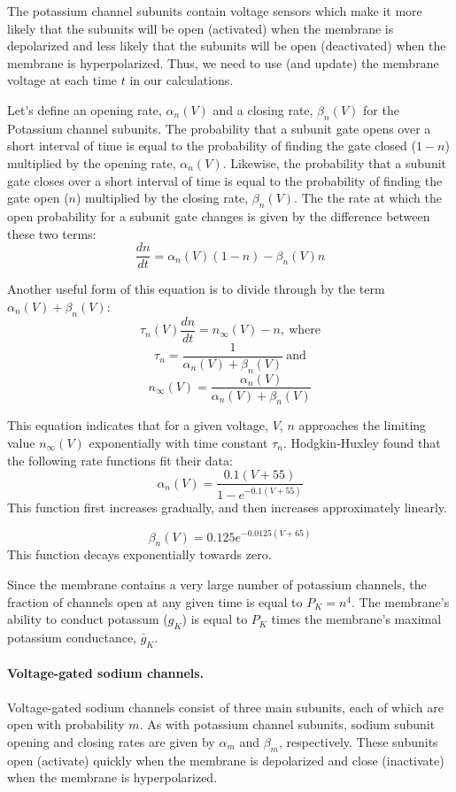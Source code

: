 \documentclass[11pt]{article}
\begin{document}
The potassium channel subunits contain voltage sensors which make it more likely that the subunits will be open (activated) when the membrane is depolarized and less likely that the subunits will be open (deactivated) when the membrane is hyperpolarized.  Thus, we need to use (and update) the membrane voltage at each time $t$ in our calculations.

Let's define an opening rate, $\alpha_n(V)$ and a closing rate, $\beta_n(V)$ for the Potassium channel subunits.  The probability that a subunit gate opens over a short interval of time is equal to the probability of finding the gate closed ($1-n$) multiplied by the opening rate, $\alpha_n(V)$.  Likewise, the probability that a subunit gate closes over a short interval of time is equal to the probability of finding the gate open ($n$) multiplied by the closing rate, $\beta_n(V)$.  The the rate at which the open probability for a subunit gate changes is given by the difference between these two terms:
\[
\frac{dn}{dt} =\alpha_n(V)(1-n) - \beta_n(V)n
\]

Another useful form of this equation is to divide through by the term $\alpha_n(V) + \beta_n(V)$:
\[
\tau_n(V)\frac{dn}{dt} = n_\infty(V) - n\mathrm{,~where}
\]
\[
\tau_n = \frac{1}{\alpha_n(V) + \beta_n(V)}\mathrm{~and}
\]
\[
n_\infty(V) = \frac{\alpha_n(V)}{\alpha_n(V) + \beta_n(V)}
\]

This equation indicates that for a given voltage, $V$, $n$ approaches the limiting value $n_\infty(V)$ exponentially with time constant $\tau_n$.  Hodgkin-Huxley found that the following rate functions fit their data:
\[
\alpha_n(V) = \frac{0.1(V + 55)}{1 - e^{-0.1(V+55)}}
\]
This function first increases gradually, and then increases approximately linearly.

\[
\beta_n(V) = 0.125e^{-0.0125(V+65)}
\]
This function decays exponentially towards zero.

Since the membrane contains a very large number of potassium channels, the fraction of channels open at any given time is equal to $P_K = n^4$.  The membrane's ability to conduct potassum ($g_K$) is equal to $P_K$ times the membrane's maximal potassium conductance, $\bar{g}_K$.

\paragraph{Voltage-gated sodium channels.} Voltage-gated sodium channels consist of three main subunits, each of which are open with probability $m$.  As with potassium channel subunits, sodium subunit opening and closing rates are given by $\alpha_m$ and $\beta_m$, respectively.  These subunits open (activate) quickly when the membrane is depolarized and close (inactivate) when the membrane is hyperpolarized.
\end{document}

